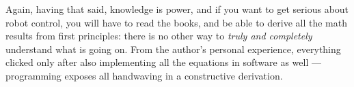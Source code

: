 Again, having that said, knowledge is power, and if you want to get serious
about robot control, you will have to read the books, and be able to derive
all the math results from first principles: 
there is no other way to \textit{truly and completely} understand
what is going on.
From the author's personal experience, everything clicked only after
also implementing all the equations in software as well --- programming
exposes all handwaving in a constructive derivation.

%
%
%
%
